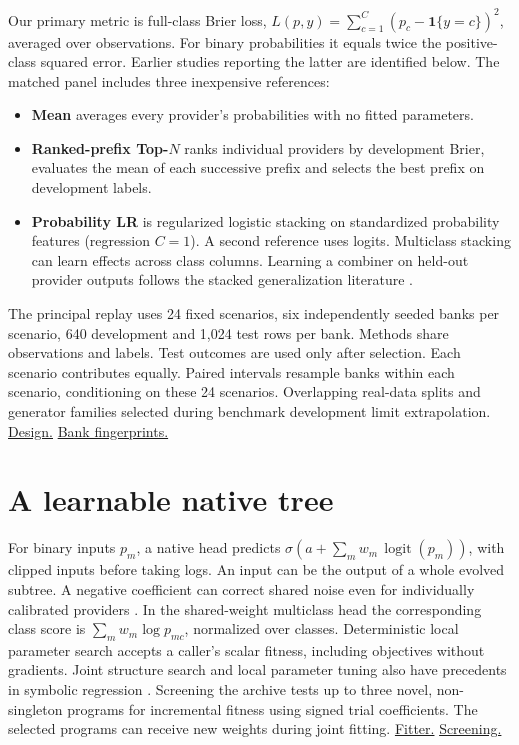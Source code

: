 \documentclass[10pt,a4paper]{article}
\newcommand{\FB}[2]{\href{https://github.com/damiankucharski/fusionbench/blob/5f9254e0c6e4559d7c0d19f28dc91641fba09d57/docs/ensemble-study/#1}{#2}}
\newcommand{\LAB}[2]{\href{https://github.com/damiankucharski/OKAPI/blob/1d7ad2d1660627585329bc584a9c4634915e8bb1/#1}{#2}}
\begin{document}
Our primary metric is full-class Brier loss, $L(p,y)=\sum_{c=1}^{C}(p_c-\mathbf{1}\{y=c\})^2$, averaged over observations. For binary probabilities it equals twice the positive-class squared error. Earlier studies reporting the latter are identified below. The matched panel includes three inexpensive references:
\begin{itemize}
\item \textbf{Mean} averages every provider's probabilities with no fitted parameters.
\item \textbf{Ranked-prefix Top-$N$} ranks individual providers by development Brier, evaluates the mean of each successive prefix and selects the best prefix on development labels.
\item \textbf{Probability LR} is regularized logistic stacking on standardized probability features (regression $C=1$). A second reference uses logits. Multiclass stacking can learn effects across class columns. Learning a combiner on held-out provider outputs follows the stacked generalization literature \cite{ting}.
\end{itemize}
The principal replay uses 24 fixed scenarios, six independently seeded banks per scenario, 640 development and 1,024 test rows per bank. Methods share observations and labels. Test outcomes are used only after selection. Each scenario contributes equally. Paired intervals resample banks within each scenario, conditioning on these 24 scenarios. Overlapping real-data splits and generator families selected during benchmark development limit extrapolation. \FB{replacement-experiment/panel/protocol.md}{Design.} \FB{replacement-experiment/panel/results/banks.json}{Bank fingerprints.}

\section{A learnable native tree}
For binary inputs $p_m$, a native head predicts $\sigma(a+\sum_m w_m\,\operatorname{logit}(p_m))$, with clipped inputs before taking logs. An input can be the output of a whole evolved subtree. A negative coefficient can correct shared noise even for individually calibrated providers \cite{kahn}. In the shared-weight multiclass head the corresponding class score is $\sum_m w_m\log p_{mc}$, normalized over classes. Deterministic local parameter search accepts a caller's scalar fitness, including objectives without gradients. Joint structure search and local parameter tuning also have precedents in symbolic regression \cite{kommenda}. Screening the archive tests up to three novel, non-singleton programs for incremental fitness using signed trial coefficients. The selected programs can receive new weights during joint fitting. \LAB{okapi/pattern_logit.py}{Fitter.} \LAB{okapi/pattern_features.py}{Screening.}
\end{document}
